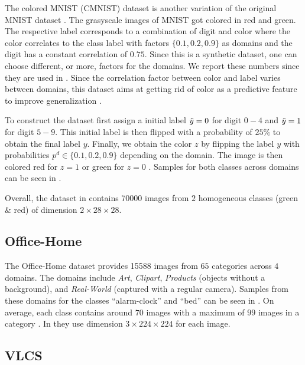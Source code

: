 The colored MNIST (CMNIST) dataset \citep{arjovsky2019invariant} is another variation of the original MNIST dataset \citep{lecun-mnisthandwrittendigit-2010}. The grasyscale images of MNIST got colored in red and green. The respective label corresponds to a combination of digit and color where the color correlates to the class label with factors $\{0.1,0.2,0.9\}$ as domains and the digit has a constant correlation of $0.75$. Since this is a synthetic dataset, one can choose different, or more, factors for the domains. We report these numbers since they are used in \citet{gulrajani2020search, arjovsky2019invariant}. Since the correlation factor between color and label varies between domains, this dataset aims at getting rid of color as a predictive feature to improve generalization \citep{arjovsky2019invariant}.

To construct the dataset \citet{arjovsky2019invariant} first assign a initial label $\Tilde{y} = 0$ for digit $0-4$ and $\Tilde{y} = 1$ for digit $5-9$. This initial label is then flipped with a probability of $25\%$ to obtain the final label $y$. Finally, we obtain the color $z$ by flipping the label $y$ with probabilities $p^d \in \{0.1,0.2,0.9\}$ depending on the domain. The image is then colored red for $z=1$ or green for $z=0$ \citep{arjovsky2019invariant}. Samples for both classes across domains can be seen in .

Overall, the dataset in \citet{gulrajani2020search} contains \num{70000} images from $2$ homogeneous classes (green \& red) of dimension $2 \times 28 \times 28$.  


\subsection{Office-Home}
The Office-Home dataset \citep{VenkateswaraECP17}  provides \num{15588} images from $65$ categories across $4$ domains. The domains include \emph{Art}, \emph{Clipart}, \emph{Products} (objects without a background), and \emph{Real-World} (captured with a regular camera). Samples from these domains for the classes ``alarm-clock'' and ``bed'' can be seen in . On average, each class contains around $70$ images with a maximum of $99$ images in a category \citep{VenkateswaraECP17}. In \citet{gulrajani2020search} they use dimension $3 \times 224 \times 224$ for each image. 


\subsection{VLCS}

